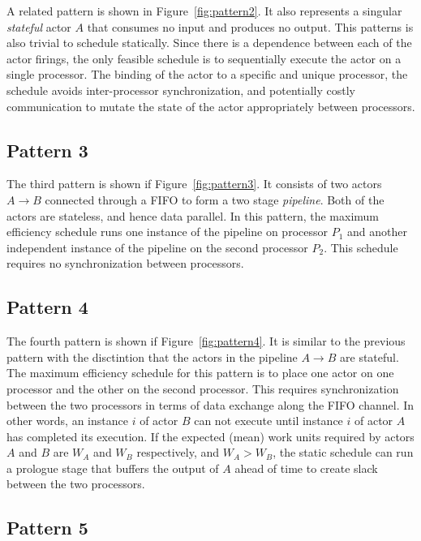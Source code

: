 A related pattern is shown in Figure~\ref{fig:pattern2}. It also
represents a singular {\it stateful} actor $A$ that consumes no input
and produces no output.
This patterns is also trivial to schedule statically. Since there is a
dependence between each of the actor firings, the only feasible
schedule is to sequentially execute the actor on a single
processor. The binding of the actor to a specific and unique
processor, the schedule avoids inter-processor synchronization, and
potentially costly communication to mutate the state of the actor
appropriately between processors.

\subsection{Pattern 3}

The third pattern is shown if Figure~\ref{fig:pattern3}. It consists
of two actors $A\rightarrow B$ connected through a FIFO to form a two
stage {\it pipeline}. Both of the actors are stateless, and hence data
parallel. In this pattern, the maximum efficiency schedule runs one
instance of the pipeline on processor $P_1$ and another independent
instance of the pipeline on the second processor $P_2$.  This schedule
requires no synchronization between processors.

\subsection{Pattern 4}

The fourth pattern is shown if Figure~\ref{fig:pattern4}. It is
similar to the previous pattern with the disctintion that the actors
in the pipeline $A\rightarrow B$ are stateful. The maximum efficiency
schedule for this pattern is to place one actor on one processor and
the other on the second processor. This requires synchronization
between the two processors in terms of data exchange along the FIFO
channel. In other words, an instance $i$ of actor $B$ can not execute
until instance $i$ of actor $A$ has completed its execution.  If the
expected (mean) work units required by actors $A$ and $B$ are $W_A$
and $W_B$ respectively, and $W_A > W_B$, the static schedule can
run a prologue stage that buffers the output of $A$ ahead of time to
create slack between the two processors.

\subsection{Pattern 5}

